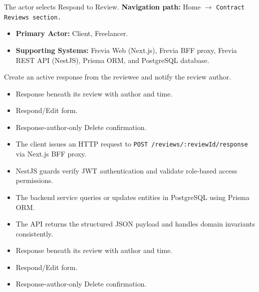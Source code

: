 The actor selects Respond to Review.\newline
\textbf{Navigation path:} Home $\rightarrow$ \texttt{Contract Reviews section.}


\begin{itemize}[leftmargin=1.6em,topsep=3pt,itemsep=2pt,parsep=0pt,label=$\bullet$]
    \item \textbf{Primary Actor:} Client, Freelancer.
    \item \textbf{Supporting Systems:} Frevia Web (Next.js), Frevia BFF proxy, Frevia REST API (NestJS), Prisma ORM, and PostgreSQL database.
\end{itemize}

\noindent Create an active response from the reviewee and notify the review author.

\begin{itemize}[leftmargin=1.6em,topsep=3pt,itemsep=2pt,parsep=0pt,label=$\bullet$]
    \item Response beneath its review with author and time.
    \item Respond/Edit form.
    \item Response-author-only Delete confirmation.
\end{itemize}

\begin{itemize}[leftmargin=1.6em,topsep=3pt,itemsep=2pt,parsep=0pt,label=$\bullet$]
    \item The client issues an HTTP request to \texttt{POST /\allowbreak{}reviews/\allowbreak{}:\allowbreak{}reviewId/\allowbreak{}response} via Next.js BFF proxy.
    \item NestJS guards verify JWT authentication and validate role-based access permissions.
    \item The backend service queries or updates entities in PostgreSQL using Prisma ORM.
    \item The API returns the structured JSON payload and handles domain invariants consistently.
\end{itemize}

\begin{itemize}[leftmargin=1.6em,topsep=3pt,itemsep=2pt,parsep=0pt,label=$\bullet$]
    \item Response beneath its review with author and time.
    \item Respond/Edit form.
    \item Response-author-only Delete confirmation.
\end{itemize}

